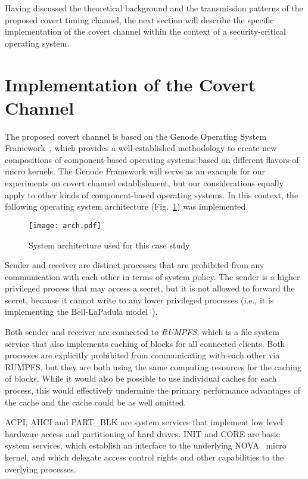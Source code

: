 \documentclass[runningheads,a4paper]{llncs}
\begin{document}
Having discussed the theoretical background and the transmission patterns of the proposed covert timing channel, the next section will describe the specific implementation of the covert channel within the context of a security-critical operating system.

\section{Implementation of the Covert Channel}\label{sec4}

The proposed covert channel is based on the Genode Operating System Framework~\cite{genode}, which provides a well-established methodology to create new compositions of component-based operating systems based on different flavors of micro kernels. 
The Genode Framework will serve as an example for our experiments on covert channel establishment, but our considerations equally apply to other kinds of component-based operating systems.
In this context, the following operating system architecture (Fig.~\ref{arch}) was implemented.

\begin{figure}[!ht]
\texttt{[image: arch.pdf]}
\caption{System architecture used for this case study}
\label{arch}
\end{figure}

Sender and receiver are distinct processes that are prohibited from any communication with each other in terms of system policy.
The sender is a higher privileged process that may access a secret, but it is not allowed to forward the secret, because it cannot write to any lower privileged processes (i.e., it is implementing the Bell-LaPadula model~\cite{bell1973}).

Both sender and receiver are connected to \emph{RUMPFS}, which is a file system service that also implements caching of blocks for all connected clients.
Both processes are explicitly prohibited from communicating with each other via RUMPFS, but they are both using the same computing resources for the caching of blocks.
While it would also be possible to use individual caches for each process, this would effectively undermine the primary performance advantages of the cache and the cache could be as well omitted.

ACPI, AHCI and PART\_BLK are system services that implement low level hardware access and partitioning of hard drives.
INIT and CORE are basic system services, which establish an interface to the underlying NOVA~\cite{Steinberg:2010:NMS:1755913.1755935} micro kernel, and which delegate access control rights and other capabilities to the overlying processes.
\end{document}
